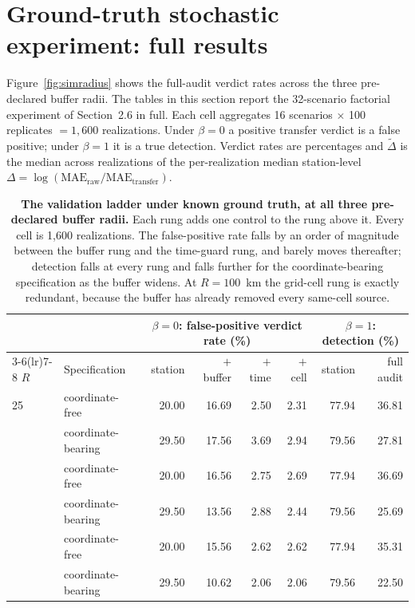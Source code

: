 \documentclass[11pt]{article}
\begin{document}
\section{Ground-truth stochastic experiment: full results}


Figure~\ref{fig:simradius} shows the full-audit verdict rates across the three pre-declared buffer radii.
The tables in this section report the 32-scenario factorial experiment of Section~2.6 in full.
Each cell aggregates 16 scenarios $\times$ 100 replicates $=1{,}600$ realizations. Under
$\beta=0$ a positive transfer verdict is a false positive; under $\beta=1$ it is a true
detection. Verdict rates are percentages and $\tilde\Delta$ is the median across realizations of
the per-realization median station-level $\Delta=\log(\mathrm{MAE_{raw}/MAE_{transfer}})$.

\begin{table}[htbp]\centering\footnotesize
\caption{\textbf{The validation ladder under known ground truth, at all three pre-declared buffer radii.} Each rung adds one control to the rung above it. Every cell is 1{,}600 realizations. The false-positive rate falls by an order of magnitude between the buffer rung and the time-guard rung, and barely moves thereafter; detection falls at every rung and falls further for the coordinate-bearing specification as the buffer widens. At $R=100$~km the grid-cell rung is exactly redundant, because the buffer has already removed every same-cell source.}
\label{si:t35}
\begin{tabular}{llrrrrrr}\toprule
& & \multicolumn{4}{c}{$\beta=0$: false-positive verdict rate (\%)} & \multicolumn{2}{c}{$\beta=1$: detection (\%)}\\
\cmidrule(lr){3-6}\cmidrule(lr){7-8}
$R$ & Specification & station & $+$buffer & $+$time & $+$cell & station & full audit \\ \midrule
25 & coordinate-free & 20.00 & 16.69 & 2.50 & 2.31 & 77.94 & 36.81 \\
 & coordinate-bearing & 29.50 & 17.56 & 3.69 & 2.94 & 79.56 & 27.81 \\
\addlinespace
50 & coordinate-free & 20.00 & 16.56 & 2.75 & 2.69 & 77.94 & 36.69 \\
 & coordinate-bearing & 29.50 & 13.56 & 2.88 & 2.44 & 79.56 & 25.69 \\
\addlinespace
100 & coordinate-free & 20.00 & 15.56 & 2.62 & 2.62 & 77.94 & 35.31 \\
 & coordinate-bearing & 29.50 & 10.62 & 2.06 & 2.06 & 79.56 & 22.50 \\
\bottomrule\end{tabular}\end{table}
\end{document}
